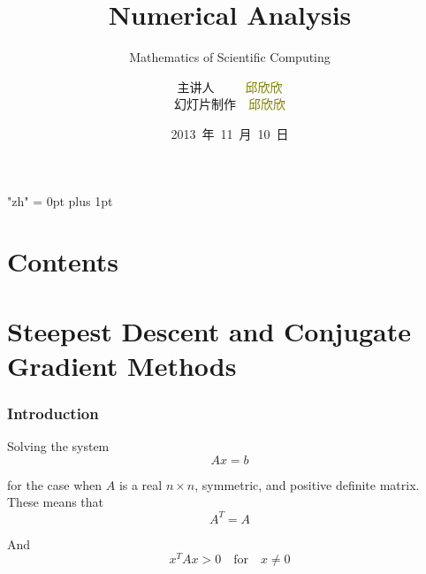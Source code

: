 \documentclass[notheorems,mathserif,table,compress]{beamer}  %
\begin{document}
\XeTeXlinebreaklocale "zh"         %
\XeTeXlinebreakskip = 0pt plus 1pt %


\title[Numerical Analysis]{Numerical Analysis}
\subtitle{Mathematics of Scientific Computing}
\author[qiu]{主讲人~~~~~\textcolor{olive}{邱欣欣}\\
    \quad 幻灯片制作~~\textcolor{olive}{邱欣欣}}
\institute[中国海洋大学]{\small\textcolor{violet}{中国海洋大学~~信息科学与工程学院}}
\date{2013~年~11~月~10~日}
\frame{ \titlepage }
\section*{Contents}
\section{Steepest Descent and Conjugate Gradient Methods}

%
\begin{frame}
\frametitle{Introduction}
Solving the system
\begin{displaymath}
Ax=b
\end{displaymath}

for the case when $A$ is a real $n\times n$, \textsf{symmetric}, and \textsf{positive definite matrix}. These means that 
\begin{displaymath}
A^T=A
\end{displaymath}

And 
\begin{displaymath}
x^TAx>0 \quad \textrm{for}\quad x\neq 0
\end{displaymath}
\end{frame}
\end{document}
